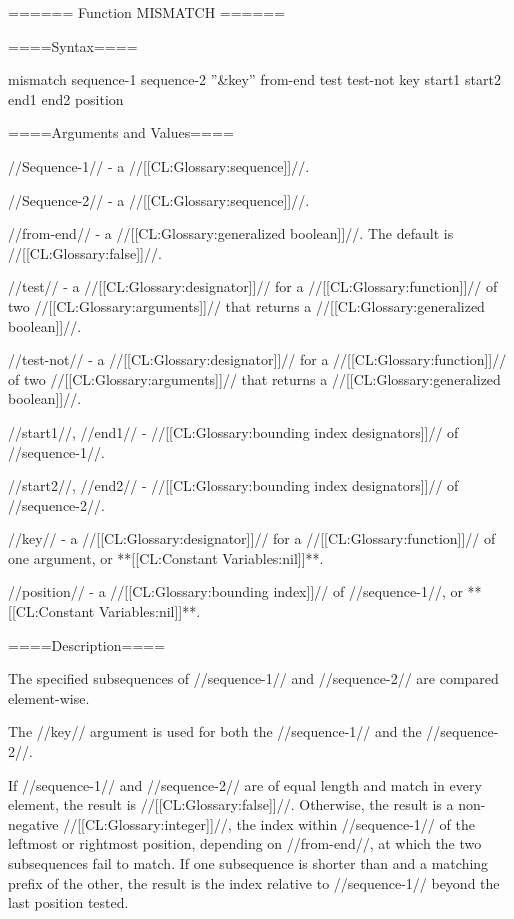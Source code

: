 ====== Function MISMATCH ======

====Syntax====

\DefunWithValuesNewline mismatch {sequence-1 sequence-2 ''&key'' from-end test test-not key start1 start2 end1 end2} {position}

====Arguments and Values====

//Sequence-1// - a //[[CL:Glossary:sequence]]//.

//Sequence-2// - a //[[CL:Glossary:sequence]]//.

//from-end// - a //[[CL:Glossary:generalized boolean]]//. The default is //[[CL:Glossary:false]]//.

//test// - a //[[CL:Glossary:designator]]// for a //[[CL:Glossary:function]]// of two //[[CL:Glossary:arguments]]// that returns a //[[CL:Glossary:generalized boolean]]//.

//test-not// - a //[[CL:Glossary:designator]]// for a //[[CL:Glossary:function]]// of two //[[CL:Glossary:arguments]]// that returns a //[[CL:Glossary:generalized boolean]]//.

//start1//, //end1// - //[[CL:Glossary:bounding index designators]]// of //sequence-1//. 

//start2//, //end2// - //[[CL:Glossary:bounding index designators]]// of //sequence-2//. 

//key// - a //[[CL:Glossary:designator]]// for a //[[CL:Glossary:function]]// of one argument, or **[[CL:Constant Variables:nil]]**.

//position// - a //[[CL:Glossary:bounding index]]// of //sequence-1//, or **[[CL:Constant Variables:nil]]**.

====Description====

The specified subsequences of //sequence-1// and //sequence-2// are compared element-wise.

The //key// argument is used for both the //sequence-1// and the //sequence-2//.

If //sequence-1// and //sequence-2// are of equal length and match in every element, the result is //[[CL:Glossary:false]]//. Otherwise, the result is a non-negative //[[CL:Glossary:integer]]//, the index within //sequence-1// of the leftmost or rightmost position, depending on //from-end//, at which the two subsequences fail to match. If one subsequence is shorter than and a matching prefix of the other, the result is the index relative to //sequence-1// beyond the last position tested.


